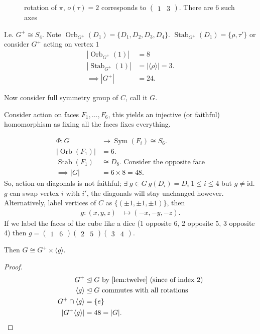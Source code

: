 \begin{itemize}
\begin{figure}
        \caption{rotation of $\pi$, $o(\tau) = 2$ corresponds to $\begin{pmatrix}1 & 3\end{pmatrix}$. There are 6 such axes}
    \end{figure}
\end{itemize}
I.e. $G^+ \cong S_4$.
Note $\operatorname{Orb}_{G^+}(D_1) = \{ D_1, D_2, D_3, D_4 \}$.
$\operatorname{Stab}_{G^+}(D_1) = \{\rho, \tau'\}$
or consider $G^+$ acting on vertex $1$
\begin{align*}
    |\operatorname{Orb}_{G^+}(1)| &= 8 \\
    |\operatorname{Stab}_{G^+}(1)| &= |\langle \rho \rangle| = 3. \\
    \implies |G^+| &= 24.
\end{align*} 

Now consider full symmetry group of $C$, call it $G$.

Consider action on faces $F_1, \ldots, F_6$, this yields an injective (or faithful) homomorphism as fixing all the faces fixes everything.

\begin{align*}
    \Phi: G &\to \operatorname{Sym}(F_i) \cong S_6. \\
    |\operatorname{Orb}(F_1)| &= 6. \\
    \operatorname{Stab}(F_1) &\cong D_8. \text{ Consider the opposite face} \\
    \implies |G| &= 6 \times 8 = 48.
\end{align*} 
So, action on diagonals is not faithful; $\exists \; g \in G \ g(D_i) = D_i \ 1 \leq i \leq 4$ but $g \neq \text{id}$. 
$g$ can swap vertex $i$ with $i'$, the diagonals will stay unchanged however.
Alternatively, label vertices of $C$ as $\{(\pm 1, \pm 1, \pm 1)\}$, then 
\begin{align*}
    g : (x, y, z) &\mapsto (-x, -y, -z).
\end{align*} 
If we label the faces of the cube like a dice (1 opposite 6, 2 opposite 5, 3 opposite 4) then $g = \begin{pmatrix} 1 & 6\end{pmatrix} \begin{pmatrix}2 & 5\end{pmatrix} \begin{pmatrix}3 & 4\end{pmatrix}$.

Then $G \cong G^+ \times \langle g \rangle$.
\begin{proof}
    \begin{align*}
        G^+ &\trianglelefteq G \text{ by \Cref{lem:twelve} (since of index 2)} \\
        \langle g \rangle &\trianglelefteq G \text{ commutes with all rotations} \\
        G^+ \cap \langle g \rangle &= \{ e \} \\
        | G^+ \langle g \rangle | &= 48 = |G|.
    \end{align*} 
\end{proof} 

